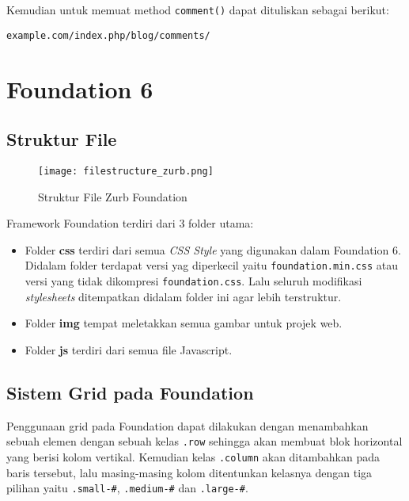 \noindent Kemudian untuk memuat method \texttt{comment()} dapat dituliskan sebagai berikut:
\begin{lstlisting}[frame=single] 
example.com/index.php/blog/comments/
\end{lstlisting}

\section{Foundation 6}

\subsection{Struktur File}
\begin{figure} [H]
	\centering  
	\texttt{[image: filestructure\_zurb.png]}  
	\caption{Struktur File Zurb Foundation} 
\end{figure}

Framework Foundation terdiri dari 3 folder utama:
\begin{itemize}
\item Folder \textbf{css} terdiri dari semua \textit{CSS Style} yang digunakan dalam Foundation 6. Didalam folder terdapat versi yag diperkecil yaitu \verb|foundation.min.css| atau versi yang tidak dikompresi \verb|foundation.css|. Lalu seluruh modifikasi \textit{stylesheets} ditempatkan didalam folder ini agar lebih terstruktur.
\item Folder \textbf{img} tempat meletakkan semua gambar untuk projek web.
\item Folder \textbf{js} terdiri dari semua file Javascript.
\end{itemize} \cite{zurbfoundation:17}

\subsection{Sistem Grid pada Foundation}
Penggunaan grid pada Foundation dapat dilakukan dengan menambahkan sebuah elemen dengan sebuah kelas \texttt{.row} sehingga akan membuat blok horizontal yang berisi kolom vertikal. Kemudian kelas \texttt{.column} akan ditambahkan pada baris tersebut, lalu masing-masing kolom ditentunkan kelasnya dengan tiga pilihan yaitu 
\texttt{.small-\#}, \texttt{.medium-\#} dan \texttt{.large-\#}.
 
